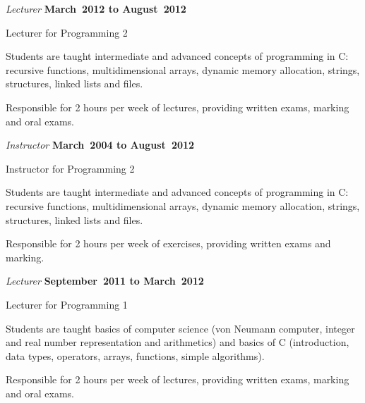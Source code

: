 \documentclass[10pt]{article}
\makeatletter
\def\adjustpenalty{\@beginparpenalty\@M \@itempenalty\@M}
\makeatother
\begin{document}
\begin{outerlist}\adjustpenalty

\item[] \textit{Lecturer} \hfill \textbf{March~2012 to August~2012}
  \begin{innerlist}
    \item Lecturer for Programming 2
      \begin{innerlist}
        \item Students are taught intermediate and advanced concepts of programming in C: recursive functions, multidimensional arrays, dynamic memory allocation, strings, structures, linked lists and files.
        \item Responsible for 2 hours per week of lectures, providing written exams, marking and oral exams.
      \end{innerlist}
  \end{innerlist}

\item[] \textit{Instructor} \hfill \textbf{March~2004 to August~2012}
  \begin{innerlist}
    \item Instructor for Programming 2
      \begin{innerlist}
        \item Students are taught intermediate and advanced concepts of programming in C: recursive functions, multidimensional arrays, dynamic memory allocation, strings, structures, linked lists and files.
        \item Responsible for 2 hours per week of exercises, providing written exams and marking.
      \end{innerlist}
  \end{innerlist}

\item[] \textit{Lecturer} \hfill \textbf{September~2011 to March~2012}
  \begin{innerlist}
    \item Lecturer for Programming 1
      \begin{innerlist}
        \item Students are taught basics of computer science (von Neumann computer, integer and real number representation and arithmetics) and basics of C (introduction, data types, operators, arrays, functions, simple algorithms).
        \item Responsible for 2 hours per week of lectures, providing written exams, marking and oral exams.
      \end{innerlist}
  \end{innerlist}


\end{outerlist}
\end{document}
